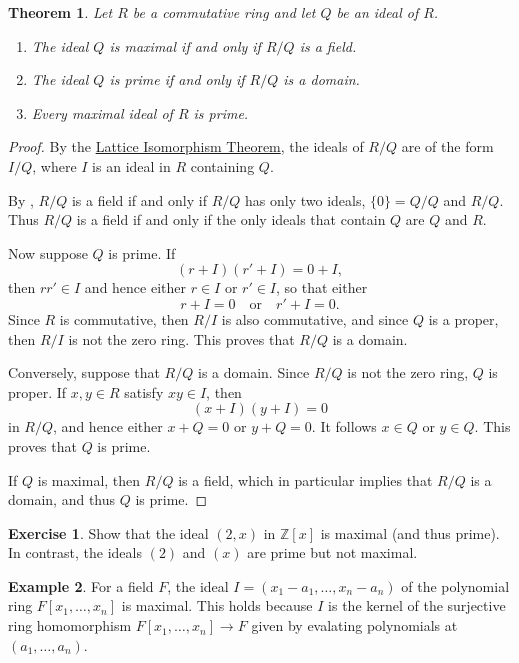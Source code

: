\documentclass[12pt]{report}
\newtheorem{theorem}{Theorem}[chapter]
\numberwithin{equation}{section}
\numberwithin{theorem}{chapter}
\theoremstyle{definition}
\newtheorem{example}[theorem]{Example}
\newtheorem{exercise}{Exercise}
\newtheorem*{basic properties}{Basic Properties}
\newtheorem*{Important Remark}{Important Remark}
\begin{document}
\begin{theorem}\label{maximal and prime ideals}
Let $R$ be a commutative ring and let $Q$ be an ideal of $R$. 
\begin{enumerate}[itemsep=0.1em,leftmargin=20pt]
\item The ideal $Q$ is maximal if and only if $R/Q$ is a field. 
\item The ideal $Q$ is prime if and only if $R/Q$ is a domain. 
\item Every maximal ideal of $R$ is prime.
\end{enumerate}
\end{theorem}




\begin{proof} 
By the \hyperref[lattice iso rings]{Lattice Isomorphism Theorem}, the ideals of $R/Q$ are of the form $I/Q$, where $I$ is an ideal in $R$ containing $Q$.

By , $R/Q$ is a field if and only if $R/Q$ has only two ideals, $\{ 0 \} = Q/Q$ and $R/Q$. Thus $R/Q$ is a field if and only if the only ideals that contain $Q$ are $Q$ and $R$.

Now suppose $Q$ is prime. If 
$$(r + I)(r' + I) = 0 + I,$$ 
then $rr' \in I$ and hence either $r \in I$ or $r' \in I$, so that either 
$$r + I = 0 \quad \text{or} \quad r'+ I  = 0.$$
Since $R$ is commutative, then $R/I$ is also commutative, and since $Q$ is a proper, then $R/I$ is not the zero ring. This proves that $R/Q$ is a domain.

Conversely, suppose that $R/Q$ is a domain. Since $R/Q$ is not the zero ring, $Q$ is proper. If $x,y \in R$ satisfy $xy \in I$, then 
$$(x + I)(y + I) = 0$$ 
in $R/Q$, and hence either $x+ Q = 0$ or $y + Q = 0$. It follows $x \in Q$ or $y \in Q$. This proves that $Q$ is prime.

If $Q$ is maximal, then $R/Q$ is a field, which in particular implies that $R/Q$ is a domain, and thus $Q$ is prime. 
\end{proof}



\begin{exercise}
Show that the ideal $(2,x)$ in $\mathbb{Z}[x]$ is maximal (and thus prime). In contrast, the ideals $(2)$ and $(x)$ are prime but not maximal.
\end{exercise}



\begin{example} 
For a field $F$, the ideal $I = (x_1 - a_1, \dots, x_n - a_n)$ of the polynomial ring $F[x_1, \dots, x_n]$ is maximal. This holds because
  $I$ is the kernel of the surjective ring homomorphism $F[x_1, \dots, x_n] \to F$ given by evalating polynomials at $(a_1, \dots, a_n)$.
\end{example}
\end{document}
